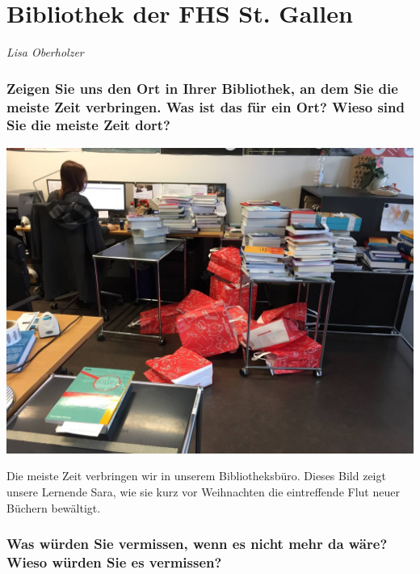 
\vspace*{.5cm}
\section{Bibliothek der FHS St. Gallen}
\begin{center}
\emph{Lisa Oberholzer}
\end{center}
\vspace*{1cm}
\hypertarget{zeigen-sie-uns-den-ort-in-ihrer-bibliothek-an-dem-sie-die-meiste-zeit-verbringen.-was-ist-das-fuxfcr-ein-ort-wieso-sind-sie-die-meiste-zeit-dort}{%
\subsubsection*{Zeigen Sie uns den Ort in Ihrer Bibliothek, an dem Sie die
meiste Zeit verbringen. Was ist das für ein Ort? Wieso sind Sie die
meiste Zeit
dort?}\label{zeigen-sie-uns-den-ort-in-ihrer-bibliothek-an-dem-sie-die-meiste-zeit-verbringen.-was-ist-das-fuxfcr-ein-ort-wieso-sind-sie-die-meiste-zeit-dort}}

\begin{center}
\includegraphics{fhs-st-gallen/img/sara.jpg}
\end{center}

Die meiste Zeit verbringen wir in unserem Bibliotheksbüro. Dieses Bild
zeigt unsere Lernende Sara, wie sie kurz vor Weihnachten die
eintreffende Flut neuer Büchern bewältigt.

\hypertarget{was-wuxfcrden-sie-vermissen-wenn-es-nicht-mehr-da-wuxe4re-wieso-wuxfcrden-sie-es-vermissen}{%
\subsubsection*{Was würden Sie vermissen, wenn es nicht mehr da wäre? Wieso
würden Sie es
vermissen?}\label{was-wuxfcrden-sie-vermissen-wenn-es-nicht-mehr-da-wuxe4re-wieso-wuxfcrden-sie-es-vermissen}}

